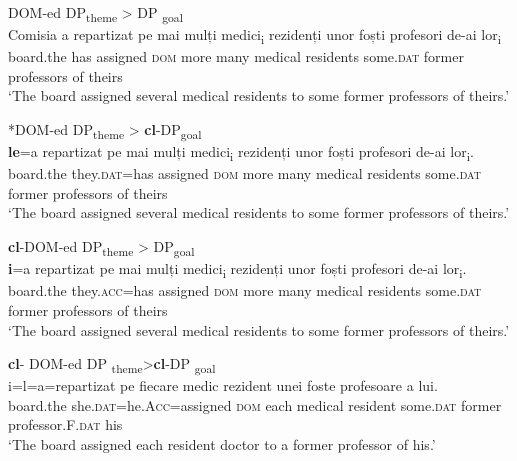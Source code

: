 \documentclass[output=paper,modfonts,nonflat,newtxmath]{langsci/langscibook}
\begin{document}
\ea%
    \label{ex:cornilescu:3}
    DOM-ed DP\textsubscript{theme} > DP \textsubscript{goal}\\
    \gll Comisia {a} {repartizat} {pe} {mai} {mulți} {medici\textsubscript{i}} {rezidenți} {unor} {foști} {profesori} {de-ai} {lor\textsubscript{i}}\\
        board.the has assigned \textsc{dom} more many medical residents some.\textsc{dat} former professors of theirs\\
    \glt ‘The board assigned several medical residents to some former professors of theirs.’
    \z



\ea%
    \label{ex:cornilescu:4}
    *DOM-ed DP\textsubscript{theme} > \textbf{cl}-DP\textsubscript{goal}\\
     \textbf{{le}}{=a} {repartizat} {pe} {mai} {mulți} {medici\textsubscript{i}} {rezidenți} {unor} {foști} {profesori} {de-ai} {lor\textsubscript{i}}.\\
        board.the  they.\textsc{dat}=has assigned  \textsc{dom} more many medical residents some.\textsc{dat} former professors of theirs\\
    \glt ‘The board assigned several medical residents to some former professors of theirs.’
    \z

          

\ea%
    \label{ex:cornilescu:5}
    \textbf{cl}-DOM-ed DP\textsubscript{theme} > DP\textsubscript{goal}\\
     \textbf{{i}}{=a} {repartizat} {pe} {mai} mulți {medici\textsubscript{i}} {rezidenți} {unor} {foști} {profesori} {de-ai} {lor\textsubscript{i}}.\\
		board.the they.\textsc{acc=}has assigned \textsc{dom} more many medical residents some.\textsc{dat} former professors of theirs\\        
    \glt ‘The board assigned several medical residents to some former professors of theirs.’
    \z




\ea%
    \label{ex:cornilescu:6}
    \textbf{cl}- DOM-ed DP \textsubscript{theme}>\textbf{cl}{}-DP \textsubscript{goal} \\
     {i=l=a=repartizat} {pe} {fiecare} {medic} {rezident} {unei} {foste} {profesoare} {a} {lui}.\\
       board.the she.\textsc{dat}=he.\textsc{Acc}=assigned \textsc{dom} each medical resident some.\textsc{dat} former professor.F.\textsc{dat} his\\
    \glt ‘The board assigned each resident doctor to a former professor of his.’
    \z
\end{document}
